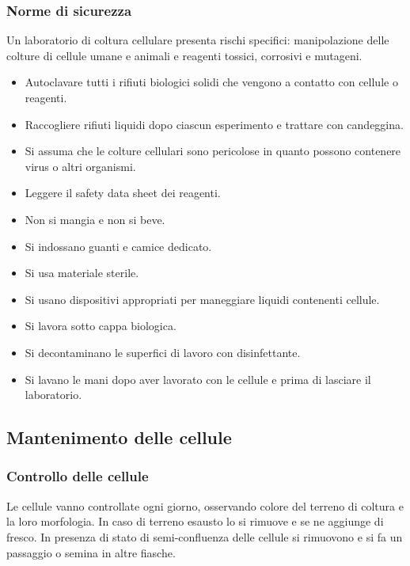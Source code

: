 		\subsubsection{Norme di sicurezza}
		Un laboratorio di coltura cellulare presenta rischi specifici: manipolazione delle colture di cellule umane e animali e reagenti tossici, corrosivi e mutageni.
		\begin{multicols}{2}
		\begin{itemize}
			\item Autoclavare tutti i rifiuti biologici solidi che vengono a contatto con cellule o reagenti.
			\item Raccogliere rifiuti liquidi dopo ciascun esperimento e trattare con candeggina. 
			\item Si assuma che le colture cellulari sono pericolose in quanto possono contenere virus o altri organismi.
			\item Leggere il safety data sheet dei reagenti.
			\item Non si mangia e non si beve.
			\item Si indossano  guanti e camice dedicato.
			\item Si usa materiale sterile.
			\item Si usano dispositivi appropriati per maneggiare liquidi contenenti cellule.
			\item Si lavora sotto cappa biologica.
			\item Si decontaminano le superfici di lavoro con disinfettante.
			\item Si lavano le mani dopo aver lavorato con le cellule e prima di lasciare il laboratorio.
		\end{itemize}
	\end{multicols}

	\subsection{Mantenimento delle cellule}

		\subsubsection{Controllo delle cellule}
		Le cellule vanno controllate ogni giorno, osservando colore del terreno di coltura e la loro morfologia.
		In caso di terreno esausto lo si rimuove e se ne aggiunge di fresco.
		In presenza di stato di semi-confluenza delle cellule si rimuovono e si fa un passaggio o semina in altre fiasche.
			
